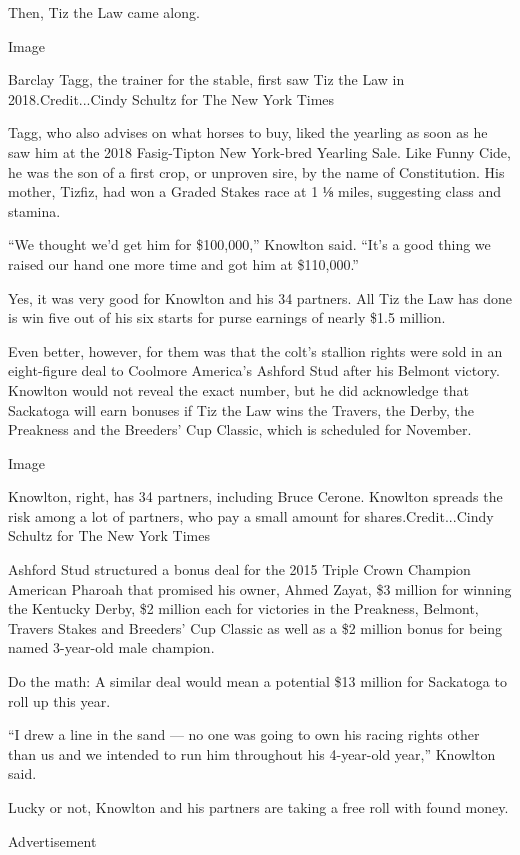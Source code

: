 Then, Tiz the Law came along.

Image

Barclay Tagg, the trainer for the stable, first saw Tiz the Law in
2018.Credit...Cindy Schultz for The New York Times

Tagg, who also advises on what horses to buy, liked the yearling as soon
as he saw him at the 2018 Fasig-Tipton New York-bred Yearling Sale. Like
Funny Cide, he was the son of a first crop, or unproven sire, by the
name of Constitution. His mother, Tizfiz, had won a Graded Stakes race
at 1 ⅛ miles, suggesting class and stamina.

``We thought we'd get him for \$100,000,'' Knowlton said. ``It's a good
thing we raised our hand one more time and got him at \$110,000.''

Yes, it was very good for Knowlton and his 34 partners. All Tiz the Law
has done is win five out of his six starts for purse earnings of nearly
\$1.5 million.

Even better, however, for them was that the colt's stallion rights were
sold in an eight-figure deal to Coolmore America's Ashford Stud after
his Belmont victory. Knowlton would not reveal the exact number, but he
did acknowledge that Sackatoga will earn bonuses if Tiz the Law wins the
Travers, the Derby, the Preakness and the Breeders' Cup Classic, which
is scheduled for November.

Image

Knowlton, right, has 34 partners, including Bruce Cerone. Knowlton
spreads the risk among a lot of partners, who pay a small amount for
shares.Credit...Cindy Schultz for The New York Times

Ashford Stud structured a bonus deal for the 2015 Triple Crown Champion
American Pharoah that promised his owner, Ahmed Zayat, \$3 million for
winning the Kentucky Derby, \$2 million each for victories in the
Preakness, Belmont, Travers Stakes and Breeders' Cup Classic as well as
a \$2 million bonus for being named 3-year-old male champion.

Do the math: A similar deal would mean a potential \$13 million for
Sackatoga to roll up this year.

``I drew a line in the sand --- no one was going to own his racing
rights other than us and we intended to run him throughout his
4-year-old year,'' Knowlton said.

Lucky or not, Knowlton and his partners are taking a free roll with
found money.

Advertisement

